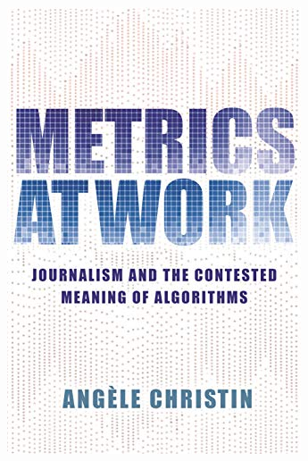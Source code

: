 \documentclass[aspectratio=43,17pt]{beamer} %
\begin{document}
\begin{frame}[plain]
\begin{columns}
\begin{column}{0.6\textwidth}
\end{column}
\begin{column}{0.4\textwidth}
\includegraphics[width=\textwidth]{figures/books/metrics.jpg}
\end{column}
\end{columns}
\end{frame}
\end{document}
